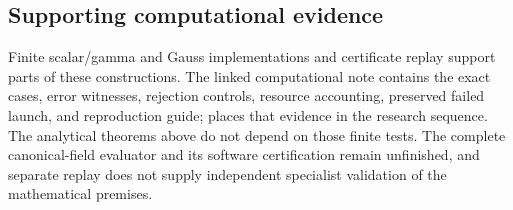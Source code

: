\subsection{Supporting computational evidence}
Finite scalar/gamma and Gauss implementations and certificate replay
support parts of these constructions. The linked computational note
\cite{rec12} contains the exact cases, error witnesses, rejection controls,
resource accounting, preserved failed launch, and reproduction guide;
\cite{rec13} places that evidence in the research sequence.
The analytical theorems above do not depend on those finite tests.
The complete canonical-field evaluator and its software certification
remain unfinished, and separate replay does not supply independent
specialist validation of the mathematical premises.
